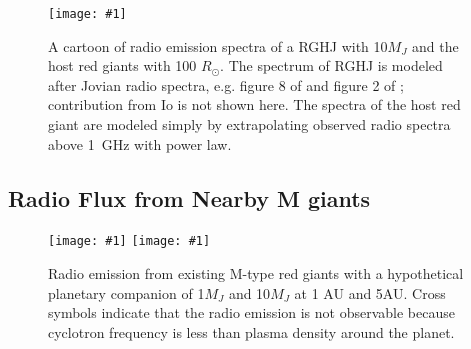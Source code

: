 \documentclass[iop,numberedappendix,apj]{emulateapj}
\def\plotonesc#1{\centering \leavevmode
\texttt{[image: \#1]}}
\def\plotoneh#1{\centering \leavevmode
\texttt{[image: \#1]}}
\begin{document}
\begin{figure*}[tbp]
   \plotonesc{cartoon_10Mj_100pc_smooth.pdf}
   \caption{A cartoon of radio emission spectra of a RGHJ with 10$M_J$ and the host red giants with 100 $R_{\odot }$.
The spectrum of RGHJ is modeled after Jovian radio spectra, e.g. figure 8 of \citet{zarka_et_al2004} and figure 2 of \citet{griesmeier2007a}; contribution from Io is not shown here.
The spectra of the host red giant are modeled simply by extrapolating observed radio spectra above 1~GHz with power law. }
  \label{fig:cartoon}
\end{figure*}


\subsection{Radio Flux from Nearby M giants}
\label{ss:actualMgiants}

\begin{figure}[tbhp]
   \plotoneh{radio_1Mp.pdf}
   \plotoneh{radio_10Mp.pdf}
   \caption{Radio emission from existing M-type red giants with a hypothetical planetary companion of 1$M_J$ and 10$M_J$ at 1 AU and 5AU.
Cross symbols indicate that the radio emission is not observable because cyclotron frequency is less than plasma density around the planet. }
  \label{fig:observability}
\end{figure}
\end{document}
